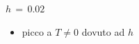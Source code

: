 \begin{frame}
\begin{columns}
\begin{column}{0.5\textwidth}
\begin{block}{$h\,=\,0.02$}
                \vspace{0.5cm}
                \begin{itemize}[itemsep=0.5em, label=$\diamond$]
                    \item picco a $T \neq 0$ dovuto ad $h$
                \end{itemize}
            
            \end{block}
        \end{column}
    \end{columns}

\end{frame}
